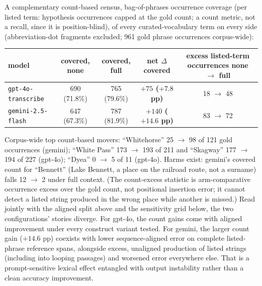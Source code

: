 \documentclass[11pt]{article}
\begin{document}
A complementary count-based census, bag-of-phrases occurrence coverage (per listed term: hypothesis occurrences capped at the gold count; a count metric, not a recall, since it is position-blind), of every curated-vocabulary term on every side (abbreviation-dot fragments excluded; 961 gold phrase occurrences corpus-wide):

\begin{center}
\begin{tabular}{@{}lcccc@{}}
\toprule
model & covered, none & covered, full & net $\Delta$ covered & excess listed-term occurrences none $\rightarrow$ full \\
\midrule
\texttt{gpt-4o-transcribe} & 690 (71.8\%) & 765 (79.6\%) & \textbf{$+75$ ($+7.8$ pp)} & 18 $\rightarrow$ 48 \\
\texttt{gemini-2.5-flash} & 647 (67.3\%) & 787 (81.9\%) & \textbf{$+140$ ($+14.6$ pp)} & 83 $\rightarrow$ 72 \\
\bottomrule
\end{tabular}
\end{center}

Corpus-wide top count-based movers: ``Whitehorse'' 25 $\rightarrow$ 98 of 121 gold occurrences (gemini); ``White Pass'' 173 $\rightarrow$ 193 of 211 and ``Skagway'' 177 $\rightarrow$ 194 of 227 (gpt-4o); ``Dyea'' 0 $\rightarrow$ 5 of 11 (gpt-4o). Harms exist: gemini's covered count for ``Bennett'' (Lake Bennett, a place on the railroad route, not a surname) falls 12 $\rightarrow$ 2 under full context. (The count-excess statistic is arm-comparative occurrence excess over the gold count, not positional insertion error; it cannot detect a listed string produced in the wrong place while another is missed.) Read jointly with the aligned split above and the sensitivity grid below, the two configurations' stories diverge. For gpt-4o, the count gains come with aligned improvement under every construct variant tested. For gemini, the larger count gain ($+14.6$ pp) coexists with lower sequence-aligned error on complete listed-phrase reference spans, alongside excess, unaligned production of listed strings (including into looping passages) and worsened error everywhere else. That is a prompt-sensitive lexical effect entangled with output instability rather than a clean accuracy improvement.
\end{document}
